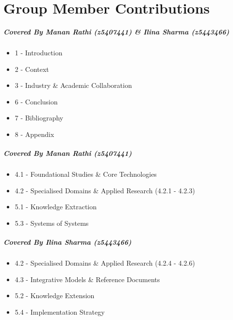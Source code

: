 \chapter*{Group Member Contributions}
\label{contributions}

    \paragraph{Covered By  Manan Rathi (z5407441) \& Ilina Sharma (z5443466)}

        \begin{itemize}
            \item 1 - Introduction
            \item 2 - Context
            \item 3 - Industry \& Academic Collaboration
            \item 6 - Conclusion
            \item 7 - Bibliography 
            \item 8 - Appendix
        \end{itemize}

    \paragraph{Covered By Manan Rathi (z5407441)}

        \begin{itemize}
            \item 4.1 - Foundational Studies \& Core Technologies
            \item 4.2 - Specialised Domains \& Applied Research (4.2.1 - 4.2.3)
            \item 5.1 - Knowledge Extraction 
            \item 5.3 - Systems of Systems
        \end{itemize}
        
    \paragraph{Covered By Ilina Sharma (z5443466)}

        \begin{itemize}
            \item 4.2 - Specialised Domains \& Applied Research (4.2.4 - 4.2.6)
            \item 4.3 - Integrative Models \& Reference Documents
            \item 5.2 - Knowledge Extension
            \item 5.4 - Implementation Strategy
        \end{itemize}